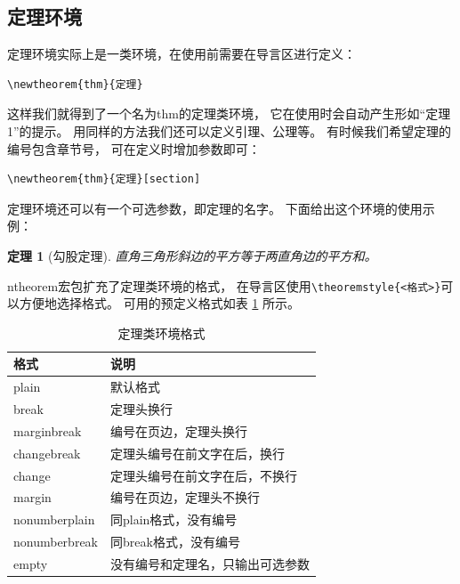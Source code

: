 \documentclass[UTF8]{ctexart}
\numberwithin{equation}{section}			%
\newtheorem{thm}{定理}[section]
{	%
    \theoremstyle{nonumberplain}
    \theoremheaderfont{\bfseries}
    \theorembodyfont{\normalfont}
    \theoremsymbol{\ensuremath{\Box}}
    \newtheorem{proof}{证明}
}
\begin{document}
    \subsection{定理环境}
    定理环境实际上是一类环境，在使用前需要在导言区进行定义：

\begin{lstlisting}
\newtheorem{thm}{定理}
\end{lstlisting}
    
    这样我们就得到了一个名为thm的定理类环境，
    它在使用时会自动产生形如“定理1”的提示。
    用同样的方法我们还可以定义引理、公理等。
    有时候我们希望定理的编号包含章节号，
    可在定义时增加参数即可：

\begin{lstlisting}
\newtheorem{thm}{定理}[section]
\end{lstlisting}
    
    定理环境还可以有一个可选参数，即定理的名字。
    下面给出这个环境的使用示例：
    
    \begin{thm}[勾股定理]
        直角三角形斜边的平方等于两直角边的平方和。
    \end{thm}	

    ntheorem宏包扩充了定理类环境的格式，
    在导言区使用\verb|\theoremstyle{<格式>}|可以方便地选择格式。
    可用的预定义格式如表 \ref{tab:thmstyle} 所示。
    
    \begin{table}
        \centering
        \caption{定理类环境格式}
        \label{tab:thmstyle}
        \begin{tabular}{ll}
            \toprule
            格式 & 说明 \\
            \midrule
            plain & 默认格式 \\
            break & 定理头换行 \\
            marginbreak & 编号在页边，定理头换行 \\
            changebreak & 定理头编号在前文字在后，换行 \\
            change & 定理头编号在前文字在后，不换行 \\
            margin & 编号在页边，定理头不换行 \\
            nonumberplain & 同plain格式，没有编号 \\
            nonumberbreak & 同break格式，没有编号 \\
            empty & 没有编号和定理名，只输出可选参数 \\
            \bottomrule
        \end{tabular}
    \end{table}
    
\end{document}
